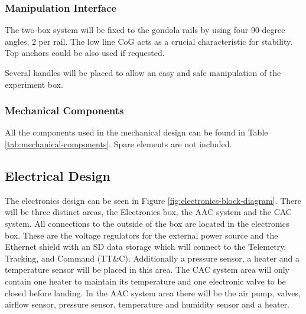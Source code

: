 \documentclass[a4paper,12pt,twoside]{article}
\providecommand{\DIFaddbegin}{} %
\providecommand{\DIFaddend}{} %
\newcommand{\DIFaddincludegraphics}[2][]{{\color{blue}\fbox{\DIFOincludegraphics[#1]{#2}}}} %
\DeclareRobustCommand{\DIFaddbegin}{\DIFOaddbegin \let\includegraphics\DIFaddincludegraphics} %
\DeclareRobustCommand{\DIFaddend}{\DIFOaddend \let\includegraphics\DIFOincludegraphics} %
\begin{document}
\DIFaddbegin \pagebreak
\DIFaddend \subsubsection{Manipulation Interface}

The two-box system will be fixed to the gondola rails by using four 90-degree angles, 2 per rail. The low line CoG acts as a crucial characteristic for stability. Top anchors could be also used if requested. 


Several handles will be placed to allow an easy and safe manipulation of the experiment box. 


\subsubsection{Mechanical Components}

All the components used in the mechanical design can be found in Table \ref{tab:mechanical-components}. Spare elements are not included. 


\raggedbottom
\pagebreak
\subsection{Electrical Design}

\begin{centering}
The electronics design can be seen in Figure \ref{fig:electronics-block-diagram}. There will be three distinct areas, the Electronics box, the AAC system and the CAC system. All connections to the outside of the box are located in the electronics box. These are the voltage regulators for the external power source and the Ethernet shield with an SD data storage which will connect to the Telemetry, Tracking, and Command (TT\&C). Additionally a pressure sensor, a heater and a temperature sensor will be placed in this area. The CAC system area will only contain one heater to maintain its temperature and one electronic valve to be closed before landing. In the AAC system area there will be the air pump, valves, airflow sensor, pressure sensor, temperature and humidity sensor and a heater.
\end{centering}
\bigskip
\end{document}
